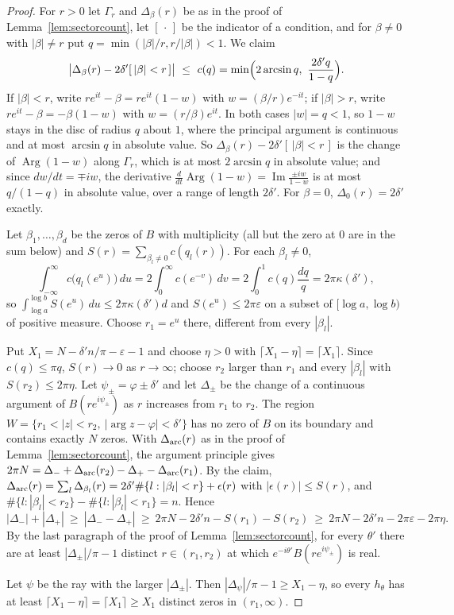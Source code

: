 \documentclass[11pt]{article}
\begin{document}
\begin{proof}
For $r>0$ let $\Gamma_r$ and $\Delta_\beta(r)$ be as in the proof of
Lemma~\ref{lem:sectorcount}, let $[\,\cdot\,]$ be the indicator of a
condition, and for $\beta\ne0$ with $|\beta|\ne r$ put
$q=\min(|\beta|/r,r/|\beta|)<1$.  We claim
\[
  \bigl|\Delta_\beta(r)-2\delta'[\,|\beta|<r\,]\bigr|\ \le\
  c(q)=\min\Bigl(2\arcsin q,\ \frac{2\delta'q}{1-q}\Bigr).
\]
If $|\beta|<r$, write $re^{it}-\beta=re^{it}(1-w)$ with
$w=(\beta/r)e^{-it}$; if $|\beta|>r$, write $re^{it}-\beta=-\beta(1-w)$ with
$w=(r/\beta)e^{it}$.  In both cases $|w|=q<1$, so $1-w$ stays in the disc of
radius $q$ about $1$, where the principal argument is continuous and at most
$\arcsin q$ in absolute value.  So $\Delta_\beta(r)-2\delta'[\,|\beta|<r\,]$
is the change of $\operatorname{Arg}(1-w)$ along $\Gamma_r$, which is at most
$2\arcsin q$ in absolute value; and since $dw/dt=\mp iw$, the derivative
$\frac{d}{dt}\operatorname{Arg}(1-w)=\operatorname{Im}\frac{\pm iw}{1-w}$ is at most $q/(1-q)$ in
absolute value, over a range of length $2\delta'$.  For $\beta=0$,
$\Delta_0(r)=2\delta'$ exactly.

Let $\beta_1,\ldots,\beta_d$ be the zeros of $B$ with multiplicity (all but
the zero at $0$ are in the sum below) and
$S(r)=\sum_{\beta_l\ne0}c(q_l(r))$.  For each $\beta_l\ne0$,
\[
  \int_{-\infty}^{\infty}c\bigl(q_l(e^u)\bigr)\,du
  =2\int_0^\infty c(e^{-v})\,dv=2\int_0^1c(q)\frac{dq}q=2\pi\kappa(\delta'),
\]
so $\int_{\log a}^{\log b}S(e^u)\,du\le2\pi\kappa(\delta')d$ and
$S(e^u)\le2\pi\varepsilon$ on a subset of $[\log a,\log b)$ of positive
measure.  Choose $r_1=e^u$ there, different from every $|\beta_l|$.

Put $X_1=N-\delta'n/\pi-\varepsilon-1$ and choose $\eta>0$
with $\lceil X_1-\eta\rceil=\lceil X_1\rceil$.  Since $c(q)\le\pi q$, $S(r)\to0$ as
$r\to\infty$; choose $r_2$ larger than $r_1$ and every $|\beta_l|$ with
$S(r_2)\le2\pi\eta$.  Let $\psi_\pm=\varphi\pm\delta'$ and let $\Delta_\pm$ be
the change of a continuous argument of $B(re^{i\psi_\pm})$ as $r$ increases
from $r_1$ to $r_2$.  The region
$W=\{r_1<|z|<r_2,\ |\arg z-\varphi|<\delta'\}$ has no zero of $B$ on its
boundary and contains exactly $N$ zeros.  With $\Delta_{\rm arc}(r)$ as in
the proof of Lemma~\ref{lem:sectorcount}, the argument principle gives
$2\pi N=\Delta_-+\Delta_{\rm arc}(r_2)-\Delta_+-\Delta_{\rm arc}(r_1)$.  By
the claim,
$\Delta_{\rm arc}(r)=\sum_l\Delta_{\beta_l}(r)=2\delta'\#\{l:|\beta_l|<r\}+\epsilon(r)$
with $|\epsilon(r)|\le S(r)$, and
$\#\{l:|\beta_l|<r_2\}-\#\{l:|\beta_l|<r_1\}=n$.  Hence
\[
  |\Delta_-|+|\Delta_+|\ \ge\ |\Delta_--\Delta_+|
  \ \ge\ 2\pi N-2\delta'n-S(r_1)-S(r_2)
  \ \ge\ 2\pi N-2\delta'n-2\pi\varepsilon-2\pi\eta .
\]
By the last paragraph of the proof of Lemma~\ref{lem:sectorcount}, for every
$\theta'$ there are at least $|\Delta_\pm|/\pi-1$ distinct
$r\in(r_1,r_2)$ at which $e^{-i\theta'}B(re^{i\psi_\pm})$ is real.

Let $\psi$ be the ray with the larger $|\Delta_\pm|$.  Then
$|\Delta_\psi|/\pi-1\ge X_1-\eta$, so every $h_\theta$ has at least
$\lceil X_1-\eta\rceil=\lceil X_1\rceil\ge X_1$ distinct zeros in
$(r_1,\infty)$.
\end{proof}
\end{document}

